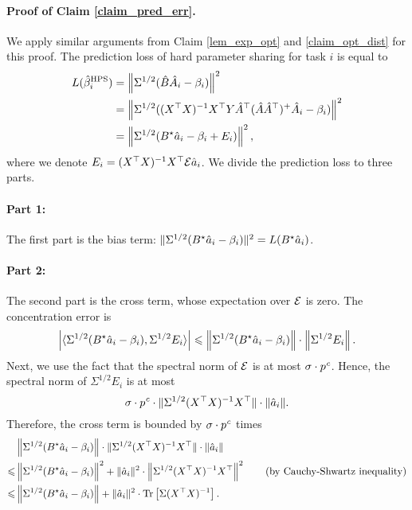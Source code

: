 	\paragraph{Proof of Claim \ref{claim_pred_err}.}
	We apply similar arguments from Claim \ref{lem_exp_opt} and \ref{claim_opt_dist} for this proof.
	The prediction loss of hard parameter sharing for task $i$ is equal to
	\begin{align*}
		L(\hat{\beta}_i^{\textup{HPS}}) &= \left\| \Sigma^{1/2} (\hat{B} \hat{A}_i - \beta_i) \right\|^2 \\
		&= \left\| \Sigma^{1/2} ((X^{\top} X)^{-1} X^{\top} Y \hat{A}^{\top} (\hat{A} \hat{A}^{\top})^{+} \hat{A}_i - \beta_i) \right\|^2 \\
		&= \left\| \Sigma^{1/2} (B^{\star} \hat{a}_i - \beta_i + E_i) \right\|^2,
	\end{align*}
	where we denote $E_i = (X^{\top} X)^{-1} X^{\top} \mathcal{E} \hat{a}_i$.
	We divide the prediction loss to three parts.

	\paragraph{Part 1:} The first part is the bias term:
	$\|\Sigma^{1/2} (B^{\star} \hat{a}_i - \beta_i)\|^2 = L(B^{\star} \hat{a}_i)$.

	\paragraph{Part 2:} The second part is the cross term, whose expectation over $\mathcal{E}$ is zero. The concentration error is
	\begin{align*}
		{\left| {\langle \Sigma^{1/2}(B^{\star} \hat{a}_i - \beta_i), \Sigma^{1/2}E_i \rangle} \right|}
		\leqslant \left\| \Sigma^{1/2} (B^{\star} \hat{a}_i - \beta_i) \right\| \cdot \left\| \Sigma^{1/2} E_i \right\|.
	\end{align*}
	Next, we use the fact that the spectral norm of $\mathcal{E}$ is at most $\sigma \cdot p^{{\mathit{c}}}$.
	Hence, the spectral norm of $\Sigma^{1/2} E_i$ is at most
		\[ \sigma \cdot p^{{\mathit{c}}} \cdot \|\Sigma^{1/2} (X^{\top} X)^{-1} X^{\top}\| \cdot \|\hat{a}_i\|. \]
	Therefore, the cross term is bounded by $\sigma \cdot p^{{\mathit{c}}}$ times
	\begin{align*}
			& \left\| \Sigma^{1/2} (B^{\star} \hat{a}_i - \beta_i) \right\| \cdot \|\Sigma^{1/2} (X^{\top} X)^{-1} X^{\top}\| \cdot \|\hat{a}_i\| \\
		\leqslant & \left\| \Sigma^{1/2} (B^{\star} \hat{a}_i - \beta_i) \right\|^2 + \|\hat{a}_i\|^2 \cdot \left\| \Sigma^{1/2} (X^{\top} X)^{-1} X^{\top} \right\|^2 \tag{by Cauchy-Shwartz inequality} \\
		\leqslant & \left\| \Sigma^{1/2}(B^{\star} \hat{a}_i - \beta_i) \right\| + \|\hat{a}_i\|^2 \cdot \operatorname{Tr}\left[\Sigma (X^{\top} X)^{-1}\right].
	\end{align*}

